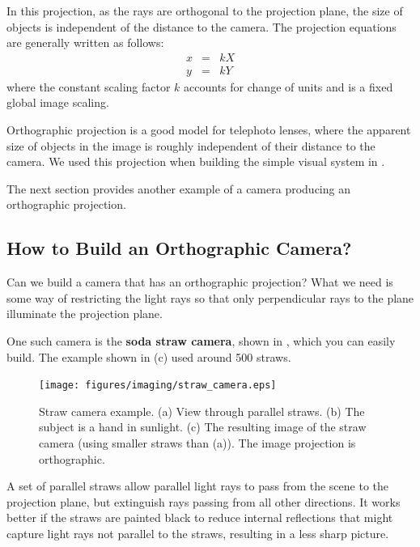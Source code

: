 In this projection, as the rays are orthogonal to the projection plane, the size of
objects is independent of the distance to the camera. The projection equations are generally written as follows:
\begin{eqnarray}
x & = & k X \nonumber \\
y & = & k Y
\label{eq:orthographicProj}
\end{eqnarray}
where the constant scaling factor $k$ accounts for change of units and is a fixed global image scaling.

Orthographic projection is a good model for telephoto lenses, where the apparent size of objects in the image
is roughly independent of their distance to the camera.  
We used this projection when building the simple visual system in \chap{\ref{chapter:simplesystem}}.



The next section provides another example of a camera producing an orthographic projection. 


\subsection{How to Build an Orthographic Camera?}

Can we build a camera that has an orthographic projection? What we need is some way of restricting the light rays so that only perpendicular rays to the plane illuminate the projection plane.

One such camera is the {\bf soda straw camera}, shown in \fig{\ref{fig:straw}}, which you can easily build. The example shown in (c) used around 500 straws.  



\begin{figure}
\centerline{
\texttt{[image: figures/imaging/straw\_camera.eps]}
}
\caption{Straw camera example.  (a) View through parallel straws. (b) The subject is  a hand in sunlight.  (c)
The resulting image of the straw camera (using smaller straws than (a)).  The image projection is orthographic.}
\label{fig:straw}
\end{figure}


A set
of parallel straws allow parallel light rays to pass from the scene to
the projection plane, but extinguish rays passing from all other
directions. It works better if the straws are painted black to reduce internal reflections that might capture light rays not parallel to the straws, resulting in a less sharp picture. 


